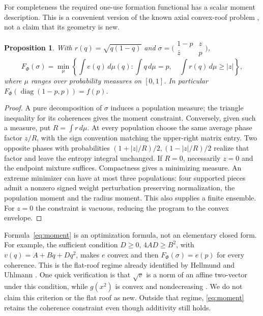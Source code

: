 \documentclass[11pt]{article}
\newtheorem{proposition}[theorem]{Proposition}
\begin{document}
For completeness the required one-use formation functional has a scalar
moment description. This is a convenient version of the known axial
convex-roof problem \cite{hu}, not a claim that its geometry is new.
\begin{proposition}\label{prop:moment}
With $r(q)=\sqrt{q(1-q)}$ and
$\sigma=\bigl(\begin{smallmatrix}1-p&z\\\bar z&p\end{smallmatrix}\bigr)$,
\begin{equation}\label{eq:moment}
 F_\Phi(\sigma)=\min_\mu\left\{\int e(q)\,d\mu(q):
       \int q\,d\mu=p,\quad\int r(q)\,d\mu\ge|z|\right\},
\end{equation}
where $\mu$ ranges over probability measures on $[0,1]$.
In particular $F_\Phi(\operatorname{diag}(1-p,p))=f(p)$.
\end{proposition}
\begin{proof}
A pure decomposition of $\sigma$ induces a population measure; the triangle
inequality for its coherences gives the moment constraint. Conversely, given
such a measure, put $R=\int r\,d\mu$. At every population choose the same
average phase factor $z/R$, with the sign convention matching the upper-right
matrix entry. Two opposite phases with probabilities
$(1+|z|/R)/2,(1-|z|/R)/2$ realize that factor and leave the entropy integral
unchanged. If $R=0$, necessarily $z=0$ and the endpoint mixture suffices.
Compactness gives a minimizing measure. An extreme minimizer can have at
most three populations: four supported pieces admit a nonzero signed weight
perturbation preserving normalization, the population moment and the radius
moment. This also supplies a finite ensemble. For $z=0$ the constraint is
vacuous, reducing the program to the convex envelope.
\end{proof}
Formula~\eqref{eq:moment} is an optimization formula, not an elementary closed
form. For example, the sufficient condition $D\ge0$, $4AD\ge B^2$, with
$v(q)=A+Bq+Dq^2$, makes $e$ convex and then $F_\Phi(\sigma)=e(p)$ for every
coherence. This is the flat-roof regime already identified by Hellmund and
Uhlmann \cite[Theorem 2 and Sections IV.C--D]{hu}. One quick verification is
that $\sqrt v$ is a norm of an affine two-vector under this condition, while
$g(x^2)$ is convex and nondecreasing \cite{wootters,hu}. We do not claim this
criterion or the flat roof as new. Outside that regime, \eqref{eq:moment}
retains the coherence constraint even though additivity still holds.
\end{document}
